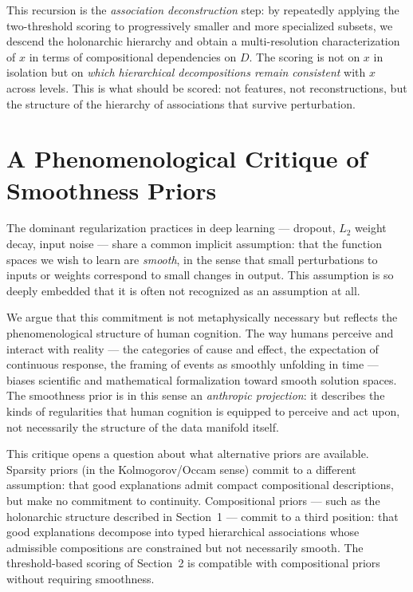 \documentclass[11pt,a4paper]{article}
\begin{document}
This recursion is the \emph{association deconstruction} step: by repeatedly applying the
two-threshold scoring to progressively smaller and more specialized subsets, we descend
the holonarchic hierarchy and obtain a multi-resolution characterization of $x$ in
terms of compositional dependencies on $D$. The scoring is not on $x$ in isolation but
on \emph{which hierarchical decompositions remain consistent} with $x$ across levels.
This is what should be scored: not features, not reconstructions, but the structure of
the hierarchy of associations that survive perturbation.

\section{A Phenomenological Critique of Smoothness Priors}

The dominant regularization practices in deep learning --- dropout, $L_2$ weight decay,
input noise --- share a common implicit assumption: that the function spaces we wish to
learn are \emph{smooth}, in the sense that small perturbations to inputs or weights
correspond to small changes in output. This assumption is so deeply embedded that it is
often not recognized as an assumption at all.

We argue that this commitment is not metaphysically necessary but reflects the
phenomenological structure of human cognition. The way humans perceive and interact with
reality --- the categories of cause and effect, the expectation of continuous response,
the framing of events as smoothly unfolding in time --- biases scientific and
mathematical formalization toward smooth solution spaces. The smoothness prior is in
this sense an \emph{anthropic projection}: it describes the kinds of regularities that
human cognition is equipped to perceive and act upon, not necessarily the structure of
the data manifold itself.

This critique opens a question about what alternative priors are available. Sparsity
priors (in the Kolmogorov/Occam sense) commit to a different assumption: that good
explanations admit compact compositional descriptions, but make no commitment to
continuity. Compositional priors --- such as the holonarchic structure described in
Section~1 --- commit to a third position: that good explanations decompose into typed
hierarchical associations whose admissible compositions are constrained but not
necessarily smooth. The threshold-based scoring of Section~2 is compatible with
compositional priors without requiring smoothness.
\end{document}
